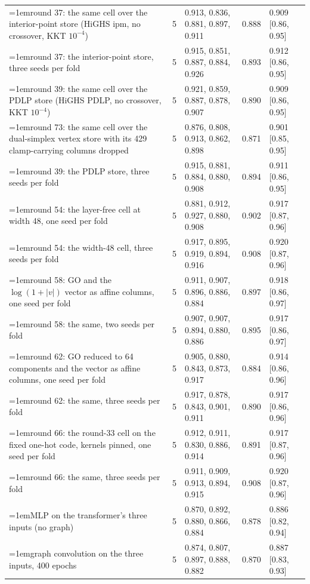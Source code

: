 \begin{table}[H]
\begin{tabular}{@{}>{\raggedright\hangindent=1em\hangafter=1\arraybackslash}p{88.6mm}rlrl@{}}
    round 37: the same cell over the interior-point store (HiGHS ipm, no crossover, KKT $10^{-4}$) & 5 & 0.913, 0.836, 0.881, 0.897, 0.911 & 0.888 & 0.909 [0.86, 0.95] \\
    round 37: the interior-point store, three seeds per fold & 5 & 0.915, 0.851, 0.887, 0.884, 0.926 & 0.893 & 0.912 [0.86, 0.95] \\
    round 39: the same cell over the PDLP store (HiGHS PDLP, no crossover, KKT $10^{-4}$) & 5 & 0.921, 0.859, 0.887, 0.878, 0.907 & 0.890 & 0.909 [0.86, 0.95] \\
    round 73: the same cell over the dual-simplex vertex store with its 429 clamp-carrying columns dropped & 5 & 0.876, 0.808, 0.913, 0.862, 0.898 & 0.871 & 0.901 [0.85, 0.95] \\
    round 39: the PDLP store, three seeds per fold & 5 & 0.915, 0.881, 0.884, 0.880, 0.908 & 0.894 & 0.911 [0.86, 0.95] \\
    round 54: the layer-free cell at width 48, one seed per fold & 5 & 0.881, 0.912, 0.927, 0.880, 0.908 & 0.902 & 0.917 [0.87, 0.96] \\
    round 54: the width-48 cell, three seeds per fold & 5 & 0.917, 0.895, 0.919, 0.894, 0.916 & 0.908 & 0.920 [0.87, 0.96] \\
    round 58: GO and the $\log(1 + |v|)$ vector as affine columns, one seed per fold & 5 & 0.911, 0.907, 0.896, 0.886, 0.884 & 0.897 & 0.918 [0.86, 0.97] \\
    round 58: the same, two seeds per fold & 5 & 0.907, 0.907, 0.894, 0.880, 0.886 & 0.895 & 0.917 [0.86, 0.97] \\
    round 62: GO reduced to 64 components and the vector as affine columns, one seed per fold & 5 & 0.905, 0.880, 0.843, 0.873, 0.917 & 0.884 & 0.914 [0.86, 0.96] \\
    round 62: the same, three seeds per fold & 5 & 0.917, 0.878, 0.843, 0.901, 0.911 & 0.890 & 0.917 [0.86, 0.96] \\
    round 66: the round-33 cell on the fixed one-hot code, kernels pinned, one seed per fold & 5 & 0.912, 0.911, 0.830, 0.886, 0.914 & 0.891 & 0.917 [0.87, 0.96] \\
    round 66: the same, three seeds per fold & 5 & 0.911, 0.909, 0.913, 0.894, 0.915 & 0.908 & 0.920 [0.87, 0.96] \\
    MLP on the transformer's three inputs (no graph) & 5 & 0.870, 0.892, 0.880, 0.866, 0.884 & 0.878 & 0.886 [0.82, 0.94] \\
    graph convolution on the three inputs, 400 epochs & 5 & 0.874, 0.807, 0.897, 0.888, 0.882 & 0.870 & 0.887 [0.83, 0.93] \\

\end{tabular}
\end{table}
